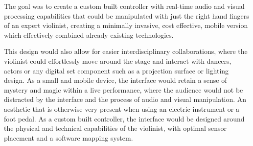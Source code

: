 \documentclass{nime-alternate}
\begin{document}
The goal was to create a custom built controller with real-time audio and visual processing capabilities that could be manipulated with just the right hand fingers of an expert violinist, creating a minimally invasive, cost effective, mobile version which effectively combined already existing technologies. 

This design would also allow for easier interdisciplinary collaborations, where the violinist could effortlessly move around the stage and interact with dancers, actors or any digital set component such as a projection surface or lighting design. As a small and mobile device, the interface would retain a sense of mystery and magic within a live performance, where the audience would not be distracted by the interface and the process of audio and visual manipulation. An aesthetic that is otherwise very present when using an electric instrument or a foot pedal. As a custom built controller, the interface would be designed around the physical and technical capabilities of the violinist, with optimal sensor placement and a software mapping system. 



 
\end{document}
